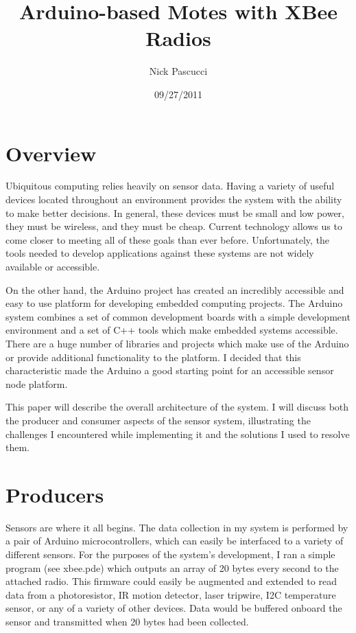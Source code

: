 \documentclass[a4paper,10pt]{article}
\title{Arduino-based Motes with XBee Radios}
\author{Nick Pascucci}
\date{09/27/2011}
\begin{document}
\maketitle

\section{Overview}
Ubiquitous computing relies heavily on sensor data. Having a variety of useful
devices located throughout an environment provides the system with the ability
to make better decisions. In general, these devices must be small and low power,
they must be wireless, and they must be cheap. Current technology allows us to
come closer to meeting all of these goals than ever before. Unfortunately, the
tools needed to develop applications against these systems are not widely
available or accessible.

On the other hand, the Arduino project has created an incredibly accessible and
easy to use platform for developing embedded computing projects. The Arduino
system combines a set of common development boards with a simple development
environment and a set of C++ tools which make embedded systems accessible. There
are a huge number of libraries and projects which make use of the Arduino or
provide additional functionality to the platform. I decided that this
characteristic made the Arduino a good starting point for an accessible sensor
node platform.

This paper will describe the overall architecture of the system. I will discuss
both the producer and consumer aspects of the sensor system, illustrating the
challenges I encountered while implementing it and the solutions I used to
resolve them.

\section{Producers}
Sensors are where it all begins. The data collection in my system is performed
by a pair of Arduino microcontrollers, which can easily be interfaced to a
variety of different sensors. For the purposes of the system's development, I
ran a simple program (see xbee.pde) which outputs an array of 20 bytes every
second to the attached radio. This firmware could easily be augmented and
extended to read data from a photoresistor, IR motion detector, laser tripwire,
I2C temperature sensor, or any of a variety of other devices. Data would be
buffered onboard the sensor and transmitted when 20 bytes had been collected.
\end{document}
